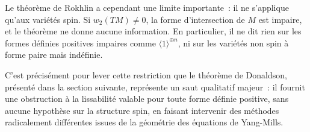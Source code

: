 \medskip

Le théorème de Rokhlin a cependant une limite importante~: il ne s'applique qu'aux variétés
spin. Si $w_2(TM) \neq 0$, la forme d'intersection de $M$ est impaire, et le théorème ne
donne aucune information. En particulier, il ne dit rien sur les formes définies positives
impaires comme $\langle 1 \rangle^{\oplus n}$, ni sur les variétés non spin à forme paire mais
indéfinie.

\medskip

C'est précisément pour lever cette restriction que le théorème de Donaldson, présenté dans la
section suivante, représente un saut qualitatif majeur~: il fournit une obstruction à la
lissabilité valable pour toute forme définie positive, sans aucune hypothèse sur la structure
spin, en faisant intervenir des méthodes radicalement différentes issues de la géométrie des
équations de Yang-Mills.